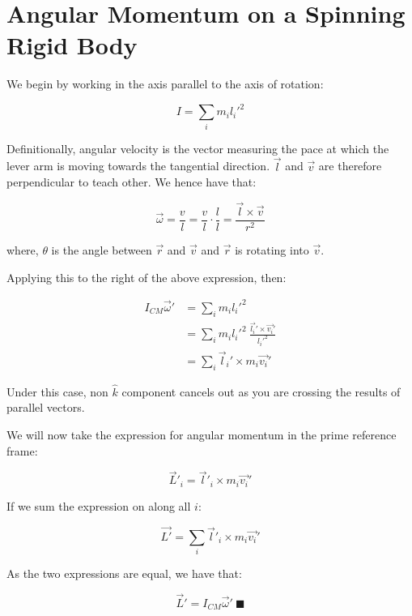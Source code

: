 \documentclass[letterpaper]{article}
\begin{document}
\section{Angular Momentum on a Spinning Rigid Body}
\label{sec:orgbd56941}
We begin by working in the axis parallel to the axis of rotation:

\begin{equation}
   I = \sum_i m_i {l_i'}^2 
\end{equation}

Definitionally, angular velocity is the vector measuring the pace at which the lever arm is moving towards the tangential direction. \(\vec{l}\) and \(\vec{v}\) are therefore perpendicular to teach other. We hence have that:

\begin{equation}
   \vec{\omega} = \frac{v}{l} = \frac{v}{l}\cdot\frac{l}{l} =  \frac{\vec{l} \times \vec{v}}{r^2}
\end{equation}

where, \(\theta\) is the angle between \(\vec{r}\) and \(\vec{v}\) and \(\vec{r}\) is rotating into \(\vec{v}\).

Applying this to the right of the above expression, then:

\begin{align}
   I_{CM} \vec{\omega}' &= \sum_i m_i {l_i}'^2 \\
&= \sum_i m_i {l_i}'^2\ \frac{\vec{l_i}' \times \vec{v_i}'}{{l_i}'^2}\\
&= \sum_i \vec{l}_i' \times m_i \vec{v_i}'
\end{align}

Under this case, non \(\hat{k}\) component cancels out as you are crossing the results of parallel vectors.

We will now take the expression for angular momentum in the prime reference frame:

\begin{equation}
   \vec{L}'_i = \vec{l}'_i \times m_i\vec{v_i}'
\end{equation}

If we sum the expression on along all \(i\):

\begin{equation}
   \vec{L'} = \sum_i \vec{l}'_i \times m_i\vec{v_i}'
\end{equation}

As the two expressions are equal, we have that:

\begin{equation}
    \vec{L}' = I_{CM} \vec{\omega}'\ \blacksquare
\end{equation}
\end{document}
